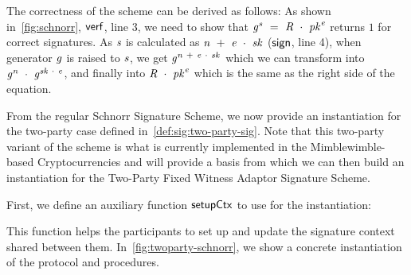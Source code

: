 The correctness of the scheme can be derived as follows:
As shown in~\cref{fig:schnorr}, $\mathsf{verf}$, line 3, we need to show that $\mathit{g}^{\mathit{s}} ~=~ \mathit{R} ~\cdot~ \mathit{pk}^{\mathit{e}}$ returns $1$ for correct signatures.
As $\mathit{s}$ is calculated as $\mathit{n} ~+~ \mathit{e} ~\cdot~ \mathit{sk}$ ($\mathsf{sign}$, line 4), when generator $\mathit{g}$ is raised to $\mathit{s}$, we get $\mathit{g}^{\mathit{n} ~+~ \mathit{e} ~\cdot~ \mathit{sk}}$ which we can transform into $\mathit{g}^{\mathit{n}} ~\cdot~ \mathit{g}^{\mathit{sk} ~\cdot~ \mathit{e}}$, and finally into $\mathit{R} ~\cdot~ \mathit{pk}^{\mathit{e}}$ which is the same as the right side of the equation.

From the regular Schnorr Signature Scheme, we now provide an instantiation for the two-party case defined in~\cref{def:sig:two-party-sig}.
Note that this two-party variant of the scheme is what is currently implemented in the Mimblewimble-based Cryptocurrencies and will provide a basis from which we can then build an instantiation for the Two-Party Fixed Witness Adaptor Signature Scheme.

First, we define an auxiliary function $\mathsf{setupCtx}$ to use for the instantiation:

\begin{center}
    \fbox{
    \begin{varwidth}{\textwidth}
        \procedure[linenumbering]{$\procSetupCtx{\varSigContext}{\varPubKeyAlice}{\varRandAlice}$} {
        \opAccess{\varSigContext}{\varPubKey} \opAssign \opAccess{\varSigContext}{\varPubKey} \opAddPoint \varPubKeyAlice \\
        \opAccess{\varSigContext}{\varRand} \opAssign \opAccess{\varSigContext}{\varRand} \opAddPoint \varRandAlice \\
        \pcreturn \varSigContext
        } \\
    \end{varwidth}
    }
\end{center}

This function helps the participants to set up and update the signature context shared between them.
In~\cref{fig:twoparty-schnorr}, we show a concrete instantiation of the protocol and procedures.


